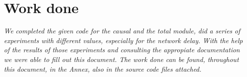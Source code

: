 \section{Work done}

\textit{We completed the given code for the causal and the total module, did a series of experiments with different values, especially for the network delay. With the help of the results of those experiments and consulting the appropiate documentation we were able to fill out this document. The work done can be found, throughout this document, in the Annex, also in the source code files attached.}
